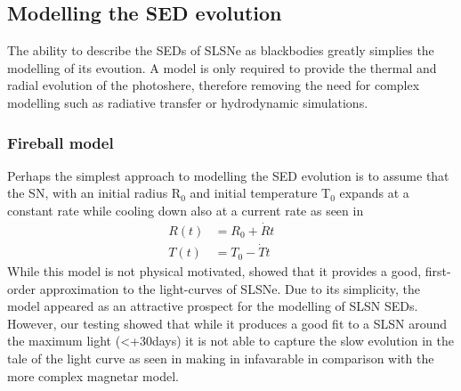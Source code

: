 \subsection{Modelling the SED evolution}
The ability to describe the SEDs of SLSNe as blackbodies greatly simplies the
modelling of its evoution. A model is only required to provide the thermal and radial evolution of the photoshere, therefore removing the need for complex modelling such as radiative transfer or hydrodynamic simulations.

\subsubsection{Fireball model}
Perhaps the simplest approach to modelling the SED evolution is to assume that the SN, with an initial radius R$_{0}$ and initial temperature T$_{0}$ expands at a constant rate while cooling down also at a current rate as seen in 
\begin{align}
\label{eq:Howell}
R(t) &= R_0 + \dot{R}t &&\\
T(t) &= T_0 - \dot{T}t &&
\end{align}
\noindent While this model is not physical motivated, \citet{Howell2013} showed that it provides a good, first-order approximation to the light-curves of SLSNe. Due to its simplicity, the model appeared as an attractive prospect for the modelling of SLSN SEDs. However, our testing showed that while it produces a good fit to a SLSN around the maximum light (<+30days) it is not able to capture the slow evolution in the tale of the light curve as seen in  making in infavarable in comparison with the more complex magnetar model.

